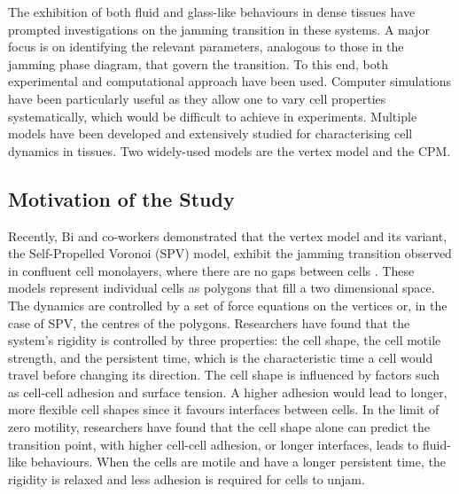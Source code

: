 \documentclass[a4paper,12pt]{article}
\begin{document}
The exhibition of both fluid and glass-like behaviours in dense tissues have prompted investigations on the jamming transition in these systems. A major focus is on identifying the relevant parameters, analogous to those in the jamming phase diagram, that govern the transition. To this end, both experimental and computational approach have been used. Computer simulations have been particularly useful as they allow one to vary cell properties systematically, which would be difficult to achieve in experiments. Multiple models have been developed and extensively studied for characterising cell dynamics in tissues. Two widely-used models are the vertex model and the CPM.  

\subsection{Motivation of the Study}
Recently, Bi and co-workers demonstrated that the vertex model and its variant, the Self-Propelled Voronoi (SPV) model, exhibit the jamming transition observed in confluent cell monolayers, where there are no gaps between cells \cite{bi2015density, bi2015motility}. These models represent individual cells as polygons that fill a two dimensional space. The dynamics are controlled by a set of force equations on the vertices or, in the case of SPV, the centres of the polygons. Researchers have found that the system's rigidity is controlled by three properties: the cell shape, the cell motile strength, and the persistent time, which is the characteristic time a cell would travel before changing its direction. The cell shape is influenced by factors such as cell-cell adhesion and surface tension. A higher adhesion would lead to longer, more flexible cell shapes since it favours interfaces between cells. In the limit of zero motility, researchers have found that the cell shape alone can predict the transition point, with higher cell-cell adhesion, or longer interfaces, leads to fluid-like behaviours. When the cells are motile and have a longer persistent time, the rigidity is relaxed and less adhesion is required for cells to unjam.

\end{document}
